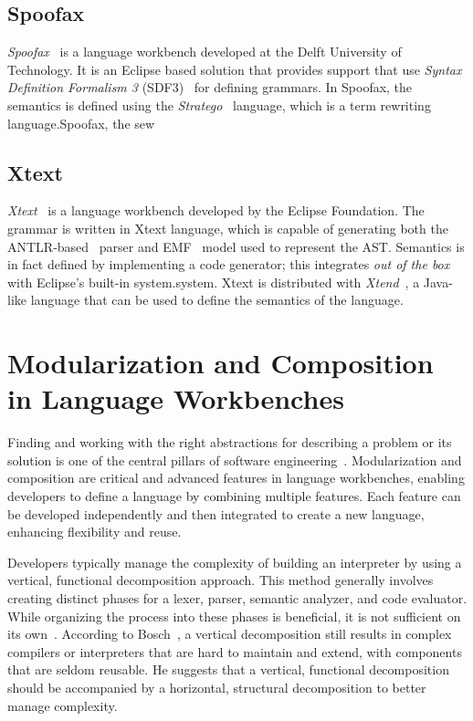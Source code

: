\subsection{Spoofax}\label{subsec:related-work:spoofax}

\textit{Spoofax}~\cite{Visser10} is a language workbench developed at the Delft University of Technology. It is an Eclipse based solution that provides support that use \textit{Syntax Definition Formalism 3} (SDF3)~\cite{Heering89c} for defining grammars.
In Spoofax, the semantics is defined using the \textit{Stratego}~\cite{Visser01} language, which is a term rewriting language.Spoofax, the sew

\subsection{Xtext}\label{subsec:related-work:xtext}

\textit{Xtext}~\cite{Bettini13b} is a language workbench developed by the Eclipse Foundation. The grammar is written in Xtext language, which is capable of generating both the ANTLR-based~\cite{Parr95} parser and EMF~\cite{Steinberg08} model used to represent the AST.  Semantics is in fact defined by implementing a code generator; this integrates \textit{out of the box} with Eclipse's built-in system.system. Xtext is distributed with \textit{Xtend}~\cite{Bettini13b}, a Java-like language that can be used to define the semantics of the language.

\section{Modularization and Composition in Language Workbenches}\label{sec:related-work:modularization}

Finding and working with the right abstractions for describing a problem or its solution is one of the central pillars of software engineering~\cite{Voelter12}. Modularization and composition are critical and advanced features in language workbenches, enabling developers to define a language by combining multiple features. Each feature can be developed independently and then integrated to create a new language, enhancing flexibility and reuse.

Developers typically manage the complexity of building an interpreter by using a vertical, functional decomposition approach. This method generally involves creating distinct phases for a lexer, parser, semantic analyzer, and code evaluator. While organizing the process into these phases is beneficial, it is not sufficient on its own~\cite{Cazzola16e}. According to Bosch~\cite{Bosch96}, a vertical decomposition still results in complex compilers or interpreters that are hard to maintain and extend, with components that are seldom reusable. He suggests that a vertical, functional decomposition should be accompanied by a horizontal, structural decomposition to better manage complexity.

